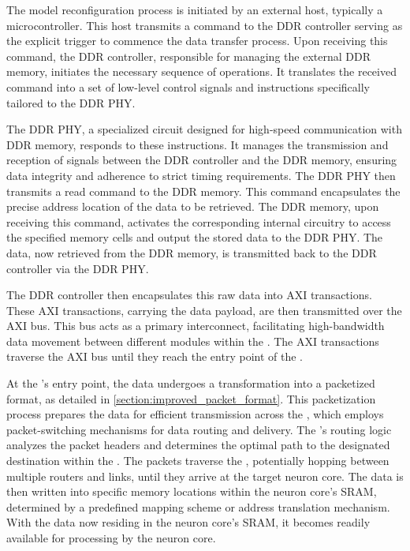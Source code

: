 The model reconfiguration process is initiated by an external host, typically a microcontroller.
This host transmits a command to the DDR controller serving as the explicit trigger to commence the data transfer process.
Upon receiving this command, the DDR controller, responsible for managing the external DDR memory, initiates the necessary sequence of operations.
It translates the received command into a set of low-level control signals and instructions specifically tailored to the DDR PHY.

The DDR PHY, a specialized circuit designed for high-speed communication with DDR memory, responds to these instructions.
It manages the transmission and reception of signals between the DDR controller and the DDR memory, ensuring data integrity and adherence to strict timing requirements.
The DDR PHY then transmits a read command to the DDR memory.
This command encapsulates the precise address location of the data to be retrieved.
The DDR memory, upon receiving this command, activates the corresponding internal circuitry to access the specified memory cells and output the stored data to the DDR PHY.
The data, now retrieved from the DDR memory, is transmitted back to the DDR controller via the DDR PHY.

The DDR controller then encapsulates this raw data into AXI transactions.
These AXI transactions, carrying the data payload, are then transmitted over the AXI bus.
This bus acts as a primary interconnect, facilitating high-bandwidth data movement between different modules within the \graicore{}.
The AXI transactions traverse the AXI bus until they reach the entry point of the \confignoc{}.

At the \confignoc{}'s entry point, the data undergoes a transformation into a packetized format, as detailed in \cref{section:improved_packet_format}.
This packetization process prepares the data for efficient transmission across the \confignoc{}, which employs packet-switching mechanisms for data routing and delivery.
The \confignoc{}'s routing logic analyzes the packet headers and determines the optimal path to the designated destination within the \graicore{}.
The packets traverse the \confignoc{}, potentially hopping between multiple routers and links, until they arrive at the target neuron core.
The data is then written into specific memory locations within the neuron core's SRAM, determined by a predefined mapping scheme or address translation mechanism.
With the data now residing in the neuron core's SRAM, it becomes readily available for processing by the neuron core.

